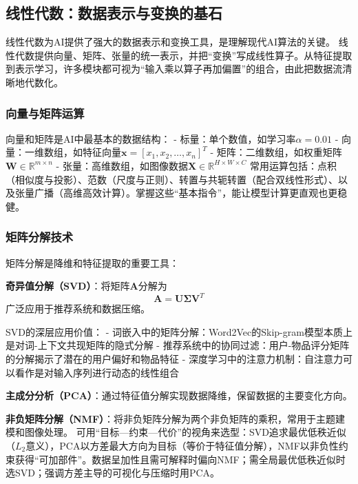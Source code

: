 \subsection{线性代数：数据表示与变换的基石}

线性代数为AI提供了强大的数据表示和变换工具，是理解现代AI算法的关键。
线性代数提供向量、矩阵、张量的统一表示，并把“变换”写成线性算子。从特征提取到表示学习，许多模块都可视为“输入乘以算子再加偏置”的组合，由此把数据流清晰地代数化。

\subsubsection{向量与矩阵运算}
向量和矩阵是AI中最基本的数据结构：
- 标量：单个数值，如学习率$\alpha = 0.01$
- 向量：一维数组，如特征向量$\mathbf{x} = [x_1, x_2, \ldots, x_n]^T$
- 矩阵：二维数组，如权重矩阵$\mathbf{W} \in \mathbb{R}^{m \times n}$
- 张量：高维数组，如图像数据$\mathbf{X} \in \mathbb{R}^{H \times W \times C}$
常用运算包括：点积（相似度与投影）、范数（尺度与正则）、转置与共轭转置（配合双线性形式）、以及张量广播（高维高效计算）。掌握这些“基本指令”，能让模型计算更直观也更稳健。

\subsubsection{矩阵分解技术}
矩阵分解是降维和特征提取的重要工具：

\textbf{奇异值分解（SVD）}：将矩阵$\mathbf{A}$分解为
$$\mathbf{A} = \mathbf{U}\mathbf{\Sigma}\mathbf{V}^T$$
广泛应用于推荐系统和数据压缩。

SVD的深层应用价值：
- 词嵌入中的矩阵分解：Word2Vec的Skip-gram模型本质上是对词-上下文共现矩阵的隐式分解
- 推荐系统中的协同过滤：用户-物品评分矩阵的分解揭示了潜在的用户偏好和物品特征
- 深度学习中的注意力机制：自注意力可以看作是对输入序列进行动态的线性组合

\textbf{主成分分析（PCA）}：通过特征值分解实现数据降维，保留数据的主要变化方向。

\textbf{非负矩阵分解（NMF）}：将非负矩阵分解为两个非负矩阵的乘积，常用于主题建模和图像处理。
可用“目标—约束—代价”的视角来选型：SVD追求最优低秩近似（$L_2$意义），PCA以方差最大方向为目标（等价于特征值分解），NMF以非负性约束获得“可加部件”。数据呈加性且需可解释时偏向NMF；需全局最优低秩近似时选SVD；强调方差主导的可视化与压缩时用PCA。

